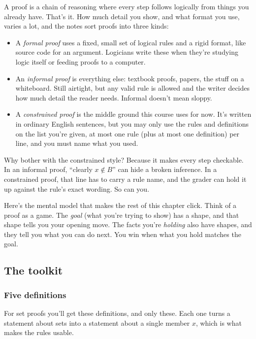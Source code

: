 A proof is a chain of reasoning where every step follows logically from things you already have. That's it. How much detail you show, and what format you use, varies a lot, and the notes sort proofs into three kinds:

\begin{itemize}
  \item A \emph{formal proof} uses a fixed, small set of logical rules and a rigid format, like source code for an argument. Logicians write these when they're studying logic itself or feeding proofs to a computer.
  \item An \emph{informal proof} is everything else: textbook proofs, papers, the stuff on a whiteboard. Still airtight, but any valid rule is allowed and the writer decides how much detail the reader needs. Informal doesn't mean sloppy.
  \item A \emph{constrained proof} is the middle ground this course uses for now. It's written in ordinary English sentences, but you may only use the rules and definitions on the list you're given, at most one rule (plus at most one definition) per line, and you must name what you used.
\end{itemize}

Why bother with the constrained style? Because it makes every step checkable. In an informal proof, ``clearly $x\notin B$'' can hide a broken inference. In a constrained proof, that line has to carry a rule name, and the grader can hold it up against the rule's exact wording. So can you.

Here's the mental model that makes the rest of this chapter click. Think of a proof as a game. The \emph{goal} (what you're trying to show) has a shape, and that shape tells you your opening move. The facts you're \emph{holding} also have shapes, and they tell you what you can do next. You win when what you hold matches the goal.

\subsection{The toolkit}

\subsubsection{Five definitions}

For set proofs you'll get these definitions, and only these. Each one turns a statement about sets into a statement about a single member $x$, which is what makes the rules usable.

